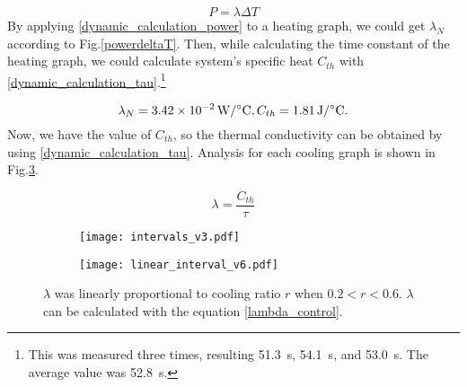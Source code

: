\begin{equation} \label{dynamic_calculation_power}
P = \lambda\Delta{T}
\end{equation}
By applying \eqref{dynamic_calculation_power} to a heating graph, we could get $\lambda_{N}$ according to Fig.\ref{powerdeltaT}. Then, while calculating the time constant of the heating graph, we could calculate \scp system's specific heat $C_{th}$ with \eqref{dynamic_calculation_tau}.\footnote{This was measured three times, resulting \SI{51.3}{\second}, \SI{54.1}{\second}, and \SI{53.0}{\second}. The average value was \SI{52.8}{\second}.} 

\begin{equation}
\lambda_{N}=\SI{3.42e-2}{\watt\per\degreeCelsius}, C_{th}=\SI{1.81}{\joule\per\degreeCelsius}. \notag
\end{equation}
Now, we have the value of $C_{th}$, so the thermal conductivity can be obtained by using \eqref{dynamic_calculation_tau}. Analysis for each cooling graph is shown in Fig.\ref{analysis_dynamic}.

\begin{equation} \label{dynamic_calculation_tau}
\lambda = \frac{C_{th}}{\tau}
\end{equation}

\begin{figure}[t]
	\begin{subfigure}[t]{0.52\linewidth}
		\centering\texttt{[image: intervals\_v3.pdf]}
		\caption{\label{dynamic_proportional}}
	\end{subfigure}%
	\begin{subfigure}[t]{0.39\linewidth}
		\centering\texttt{[image: linear\_interval\_v6.pdf]}
		\caption{\label{linear_interval}}
	\end{subfigure}
	\caption[Analysis of the dynamic experiment]{ $\lambda$ was linearly proportional to cooling ratio $r$ when $0.2<r<0.6$.   $\lambda$ can be calculated with the equation \eqref{lambda_control}.}
	\label{analysis_dynamic}
\end{figure}

